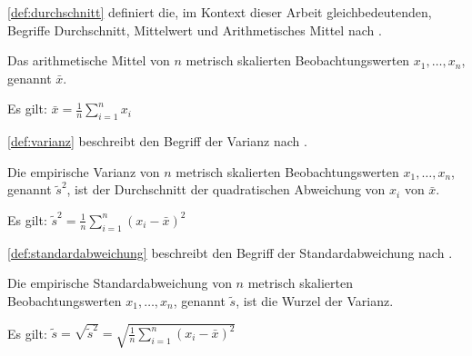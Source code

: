 \autoref{def:durchschnitt} definiert die, im Kontext dieser Arbeit gleichbedeutenden, Begriffe
Durchschnitt, Mittelwert und Arithmetisches Mittel nach \autocite[Vgl.][S.52f]{Statistik}.
\begin{definition}
    Das arithmetische Mittel von $n$ metrisch skalierten Beobachtungswerten
    $x_1,\dots,x_n$, genannt $\bar{x}$. 

    Es gilt: $\bar{x} = \frac{1}{n} \displaystyle\sum^{n}_{i=1}x_i$

    \label{def:durchschnitt}
\end{definition}

\autoref{def:varianz} beschreibt den Begriff der Varianz nach
\autocite[Vgl.][S.399]{CorrelationBetweenRelatives}.
\begin{definition}
    Die empirische Varianz von $n$ metrisch skalierten Beobachtungswerten $x_1,
    \dots, x_n$, genannt $\tilde{s}^2$, ist der Durchschnitt der quadratischen
    Abweichung von $x_i$ von $\bar{x}$.

    Es gilt: $\tilde{s}^2 = \frac{1}{n} \displaystyle\sum^{n}_{i=1}(x_i - \bar{x})^2 $
    \label{def:varianz}
\end{definition}

\autoref{def:standardabweichung} beschreibt den Begriff der Standardabweichung nach
\autocite[Vgl.][S.80]{ContributionsToTheMathematicalTheory}.
\begin{definition}
    Die empirische Standardabweichung von $n$ metrisch skalierten Beobachtungswerten $x_1,
    \dots, x_n$, genannt $\tilde{s}$, ist die Wurzel der Varianz.

    Es gilt: $\tilde{s} = \sqrt{\tilde{s}^2} = \sqrt{\frac{1}{n}
    \displaystyle\sum^{n}_{i=1}(x_i - \bar{x})^2} $
    \label{def:standardabweichung}
\end{definition}

